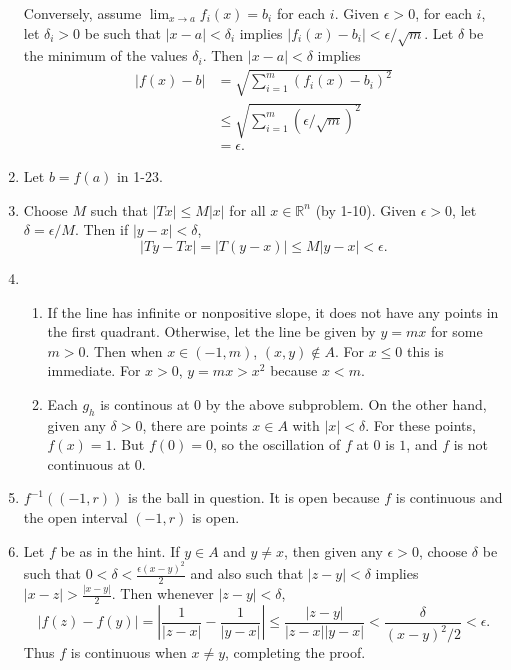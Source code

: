 \documentclass{article}
\begin{document}
\begin{enumerate}[label=\textbf{1-\arabic*.}]
Conversely, assume $\lim_{x\to a}f_i(x)= b_i$ for each $i$. Given $\epsilon > 0$, for each $i$, let $\delta_i > 0$ be such that $|x - a| < \delta_i$ implies $|f_i(x) - b_i| < \epsilon / \sqrt{m}$. Let $\delta$ be the minimum of the values $\delta_i$. Then $|x - a| < \delta$ implies 
\begin{align*}
|f(x) - b| &= \sqrt{\sum_{i=1}^m (f_i(x) - b_i)^2}\\
	&\leq \sqrt{\sum_{i=1}^m (\epsilon/\sqrt{m})^2}\\
	&= \epsilon.
\end{align*}
\item Let $b=f(a)$ in 1-23.
\item Choose $M$ such that $|Tx|\leq M|x|$ for all $x\in \mathbb R^n$ (by 1-10). Given $\epsilon > 0$, let $\delta = \epsilon/M$. Then if $|y-x| < \delta$, \[|Ty-Tx| = |T(y-x)| \leq M|y-x| < \epsilon.\]
\item
\begin{enumerate}
\item If the line has infinite or nonpositive slope, it does not have any points in the first quadrant. Otherwise, let the line be given by $y=mx$ for some $m>0$. Then when $x \in (-1,m)$, $(x,y)\notin A$. For $x \leq 0$ this is immediate. For $x > 0$, $y = mx > x^2$ because $x<m$.
\item Each $g_h$ is continous at $0$ by the above subproblem. On the other hand, given any $\delta > 0$, there are points $x\in A$ with $|x|<\delta$. For these points, $f(x) = 1$. But $f(0) = 0$, so the oscillation of $f$ at $0$ is $1$, and $f$ is not continuous at $0$.
\end{enumerate}
\item $f^{-1}((-1,r))$ is the ball in question. It is open because $f$ is continuous and the open interval $(-1,r)$ is open.
\item Let $f$ be as in the hint. If $y\in A$ and $y\neq x$, then given any $\epsilon > 0$, choose $\delta$ be such that $0 < \delta < \frac{\epsilon(x-y)^2}{2}$ and also such that $|z-y|<\delta$ implies $|x-z| > \frac{|x-y|}{2}$. Then whenever $|z-y|<\delta$, \[|f(z)-f(y)| = \left|\frac{1}{|z-x|}-\frac{1}{|y-x|}\right| \leq \frac{|z-y|}{|z-x||y-x|} < \frac{\delta}{(x-y)^2/2} < \epsilon.\] Thus $f$ is continuous when $x \neq y$, completing the proof.
\end{enumerate}
\end{document}
